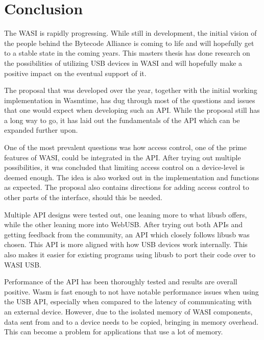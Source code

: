 \chapter{Conclusion}

The \acrfull{WASI} is rapidly progressing. While still in development, the initial vision of the people behind the Bytecode Alliance is coming to life and will hopefully get to a stable state in the coming years. This masters thesis has done research on the possibilities of utilizing \acrshort{USB} devices in \acrshort{WASI} and will hopefully make a positive impact on the eventual support of it. 

The proposal that was developed over the year, together with the initial working implementation in Wasmtime, has dug through most of the questions and issues that one would expect when developing such an \acrshort{API}. While the proposal still has a long way to go, it has laid out the fundamentals of the \acrshort{API} which can be expanded further upon.

One of the most prevalent questions was how access control, one of the prime features of \acrshort{WASI}, could be integrated in the \acrshort{API}. After trying out multiple possibilities, it was concluded that limiting access control on a device-level is deemed enough. The idea is also worked out in the implementation and functions as expected. The proposal also contains directions for adding access control to other parts of the interface, should this be needed.

Multiple \acrshort{API} designs were tested out, one leaning more to what libusb offers, while the other leaning more into WebUSB. After trying out both \acrshort{API}s and getting feedback from the community, an \acrshort{API} which closely follows libusb was chosen. This \acrshort{API} is more aligned with how \acrshort{USB} devices work internally. This also makes it easier for existing programs using libusb to port their code over to \acrshort{WASI} \acrshort{USB}.

Performance of the \acrshort{API} has been thoroughly tested and results are overall positive. \acrfull{Wasm} is fast enough to not have notable performance issues when using the \acrshort{USB} \acrshort{API}, especially when compared to the latency of communicating with an external device. However, due to the isolated memory of \acrshort{WASI} components, data sent from and to a device needs to be copied, bringing in memory overhead. This can become a problem for applications that use a lot of memory.

